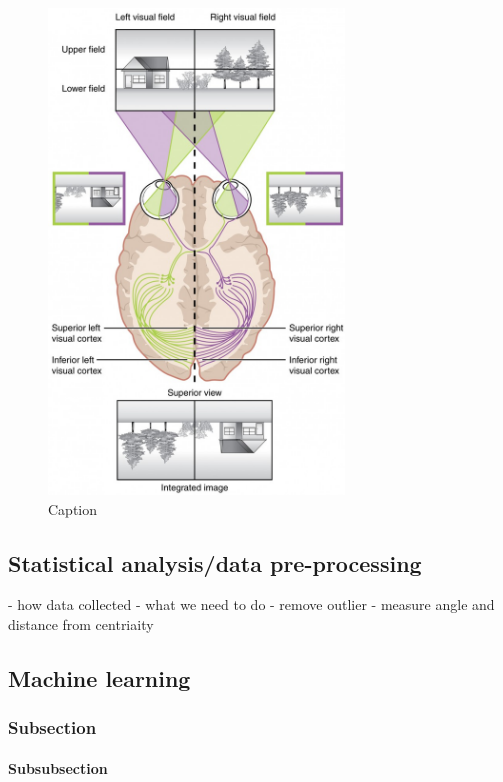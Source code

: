 \documentclass[12pt]{article}
\begin{document}
    \begin{figure}[h!]
        \centering
        \includegraphics[width=0.7\textwidth]{Images/Topographical_Image_on_Retina.jpg}
        \caption{Caption}
        \label{fig:retina_topographic}
    \end{figure}
\subsection{Statistical analysis/data pre-processing}
- how data collected
- what we need to do - remove outlier
- measure angle and distance from centriaity

\subsection{Machine learning}
\subsubsection{Subsection}
\paragraph{Subsubsection}
\newpage
\end{document}
